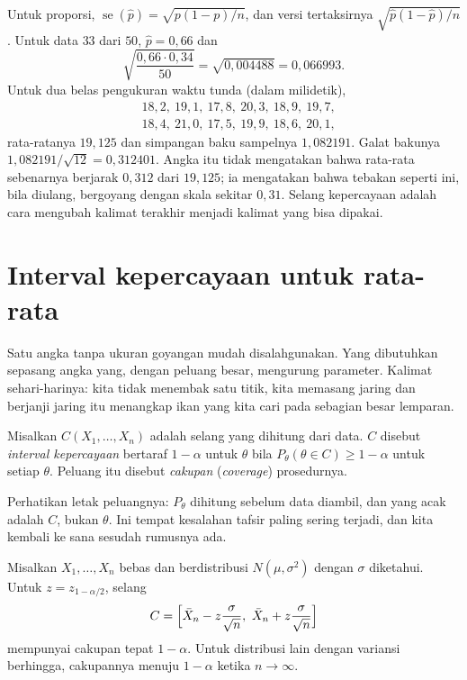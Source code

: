 Untuk proporsi, $\operatorname{se}(\hat p)=\sqrt{p(1-p)/n}$, dan versi tertaksirnya
$\sqrt{\hat p(1-\hat p)/n}$. Untuk data $33$ dari $50$, $\hat p=0{,}66$ dan
\[
\sqrt{\frac{0{,}66\cdot0{,}34}{50}}=\sqrt{0{,}004488}=0{,}066993 .
\]
Untuk dua belas pengukuran waktu tunda (dalam milidetik),
\begin{align*}
&18{,}2,\ 19{,}1,\ 17{,}8,\ 20{,}3,\ 18{,}9,\ 19{,}7,\\
&18{,}4,\ 21{,}0,\ 17{,}5,\ 19{,}9,\ 18{,}6,\ 20{,}1,
\end{align*}
rata-ratanya $19{,}125$ dan simpangan baku sampelnya $1{,}082191$. Galat bakunya
$1{,}082191/\sqrt{12}=0{,}312401$.
Angka itu tidak mengatakan bahwa rata-rata sebenarnya berjarak $0{,}312$ dari
$19{,}125$; ia mengatakan bahwa tebakan seperti ini, bila diulang, bergoyang dengan
skala sekitar $0{,}31$. Selang kepercayaan adalah cara mengubah kalimat terakhir
menjadi kalimat yang bisa dipakai.

\section{Interval kepercayaan untuk rata-rata}

Satu angka tanpa ukuran goyangan mudah disalahgunakan. Yang dibutuhkan sepasang angka
yang, dengan peluang besar, mengurung parameter. Kalimat sehari-harinya: kita tidak
menembak satu titik, kita memasang jaring dan berjanji jaring itu menangkap ikan yang
kita cari pada sebagian besar lemparan.


\begin{definisi}
Misalkan $C(X_1,\dots,X_n)$ adalah selang yang dihitung dari data. $C$ disebut
\emph{interval kepercayaan} bertaraf $1-\alpha$ untuk $\theta$ bila
$P_\theta(\theta\in C)\ge1-\alpha$ untuk setiap $\theta$. Peluang itu disebut
\emph{cakupan} (\emph{coverage}) prosedurnya.
\end{definisi}

Perhatikan letak peluangnya: $P_\theta$ dihitung sebelum data diambil, dan yang acak
adalah $C$, bukan $\theta$. Ini tempat kesalahan tafsir paling sering terjadi, dan kita
kembali ke sana sesudah rumusnya ada.

\begin{teorema}[Interval-z]
Misalkan $X_1,\dots,X_n$ bebas dan berdistribusi $N(\mu,\sigma^2)$ dengan $\sigma$
diketahui. Untuk $z=z_{1-\alpha/2}$, selang
\[
C=\Bigl[\bar X_n-z\frac{\sigma}{\sqrt n},\ \bar X_n+z\frac{\sigma}{\sqrt n}\Bigr]
\]
mempunyai cakupan tepat $1-\alpha$. Untuk distribusi lain dengan variansi berhingga,
cakupannya menuju $1-\alpha$ ketika $n\to\infty$.
\end{teorema}

